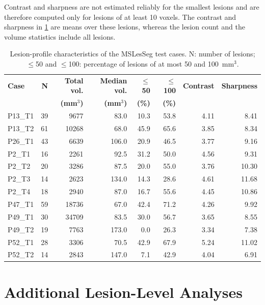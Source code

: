 Contrast and sharpness are not estimated reliably for the smallest lesions
and are therefore computed only for lesions of at least 10 voxels. The
contrast and sharpness in \cref{tab:test_case_lesion_profile} are means
over these lesions, whereas the lesion count and the volume statistics
include all lesions.

\begin{table}[H]
\centering
\caption{Lesion-profile characteristics of the MSLesSeg test cases. N:
number of lesions; $\leq$50 and $\leq$100: percentage of lesions of at most
50 and 100~mm$^3$.}
\label{tab:test_case_lesion_profile}
\begin{tabular}{lrrrrrrr}
\toprule
\textbf{Case} & \textbf{N} & \textbf{Total vol.} & \textbf{Median vol.}
& \textbf{$\leq$50} & \textbf{$\leq$100} & \textbf{Contrast} & \textbf{Sharpness} \\
& & \textbf{(mm$^3$)} & \textbf{(mm$^3$)} & \textbf{(\%)} & \textbf{(\%)} & & \\
\midrule
P13\_T1 & 39 & 9677 & 83.0 & 10.3 & 53.8 & 4.11 & 8.41 \\
P13\_T2 & 61 & 10268 & 68.0 & 45.9 & 65.6 & 3.85 & 8.34 \\
P26\_T1 & 43 & 6639 & 106.0 & 20.9 & 46.5 & 3.77 & 9.16 \\
P2\_T1  & 16 & 2261 & 92.5 & 31.2 & 50.0 & 4.56 & 9.31 \\
P2\_T2  & 20 & 3286 & 87.5 & 20.0 & 55.0 & 3.76 & 10.30 \\
P2\_T3  & 14 & 2623 & 134.0 & 14.3 & 28.6 & 4.61 & 11.68 \\
P2\_T4  & 18 & 2940 & 87.0 & 16.7 & 55.6 & 4.45 & 10.86 \\
P47\_T1 & 59 & 18736 & 67.0 & 42.4 & 71.2 & 4.26 & 9.92 \\
P49\_T1 & 30 & 34709 & 83.5 & 30.0 & 56.7 & 3.65 & 8.55 \\
P49\_T2 & 19 & 7763 & 173.0 & 0.0 & 26.3 & 3.34 & 7.38 \\
P52\_T1 & 28 & 3306 & 70.5 & 42.9 & 67.9 & 5.24 & 11.02 \\
P52\_T2 & 14 & 2843 & 147.0 & 7.1 & 42.9 & 4.04 & 6.91 \\
\bottomrule
\end{tabular}
\end{table}

\section{Additional Lesion-Level Analyses}
\label{appendix:lesion-level-analyses}

